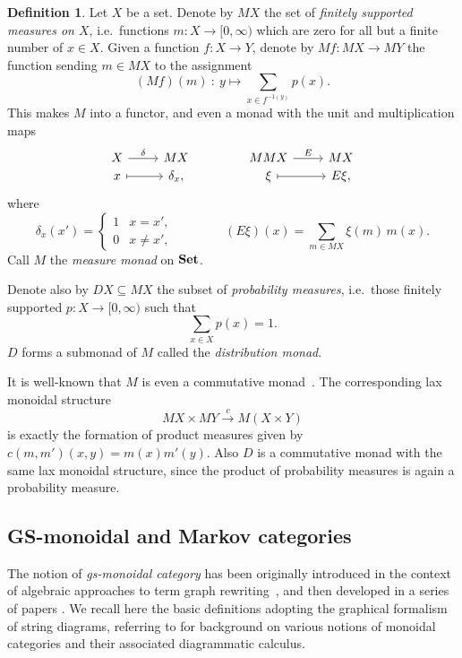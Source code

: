 \documentclass[a4paper,UKenglish,numberwithinsect,cleveref, autoref, thm-restate]{lipics-v2021}
\theoremstyle{plain} %
\theoremstyle{definition} %
\newtheorem{mydefinition}[mytheorem]{Definition}
\begin{document}
\begin{mydefinition}\label{monadM}
 Let $X$ be a set. Denote by $MX$ the set of \emph{finitely supported measures on $X$}, i.e.~functions $m:X\to[0,\infty)$ which are zero for all but a finite number of $x\in X$. 
 Given a function $f:X\to Y$, denote by $Mf:MX\to MY$ the function sending $m\in MX$ to the assignment
 \[
	 (Mf)(m) \: : \: y \longmapsto \sum_{x\in f^{-1(y)}} p(x) .
 \]
 This makes $M$ into a functor, and even a monad with the unit and multiplication maps
 \[
  \begin{tikzcd}[row sep=0]
   X \ar{r}{\delta} & MX \\
   x \ar[mapsto]{r} & \delta_x ,
  \end{tikzcd}
  \qquad\qquad
  \begin{tikzcd}[row sep=0]
   MMX \ar{r}{E} & MX \\
   \xi \ar[mapsto]{r} & E\xi ,
  \end{tikzcd}
 \]
 where 
 \[
  \delta_x(x') = \begin{cases}
                  1 & x=x' , \\
                  0 & x\ne x',
                 \end{cases}
 \qquad\qquad
 (E\xi)(x) = \sum_{m\in MX} \xi(m)\,m(x) .
 \]
 Call $M$ the \emph{measure monad} on $\mathbf{Set}$.

 Denote also by $DX\subseteq MX$ the subset of \emph{probability measures}, i.e.~those finitely supported $p:X\to[0,\infty)$ such that
 \[
  \sum_{x\in X} p(x) = 1 .
 \]
 $D$ forms a submonad of $M$ called the \emph{distribution monad}.
\end{mydefinition}

It is well-known that $M$ is even a commutative monad~\cite{coumans2013scalars}.
The corresponding lax monoidal structure
\[
	MX \times MY \stackrel{c}{\longrightarrow} M(X \times Y)
\]
is exactly the formation of product measures given by $c(m, m')(x, y) = m(x) m'(y)$.
Also $D$ is a commutative monad with the same lax monoidal structure, since the product of probability measures is again a probability measure.

\subsection{GS-monoidal and Markov categories}

The notion of \emph{gs-monoidal category} has been originally introduced in the context of algebraic approaches to term graph rewriting~\cite{CorradiniGadducci97}, and then
developed in a series of papers \cite{CorradiniGadducci99, CorradiniGadducci02, CorradiniGadducci99b}.
We recall here the basic definitions adopting the graphical formalism of string diagrams,
referring to \cite{Selinger2011} for background on various notions of monoidal categories and their associated diagrammatic calculus.
\end{document}

